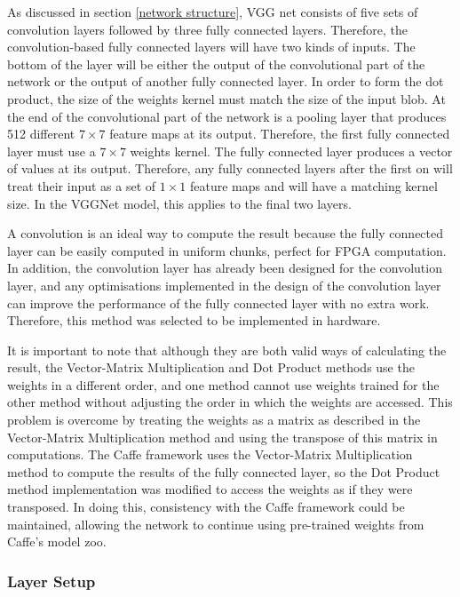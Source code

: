 \documentclass[12pt]{article}
\begin{document}
As discussed in section \ref{network structure}, VGG net consists of five sets of convolution layers followed by three fully connected layers. Therefore, the convolution-based fully connected layers will have two kinds of inputs. The bottom of the layer will be either the output of the convolutional part of the network or the output of another fully connected layer. In order to form the dot product, the size of the weights kernel must match the size of the input blob. At the end of the convolutional part of the network is a pooling layer that produces 512 different $7 \times 7$ feature maps at its output. Therefore, the first fully connected layer must use a $7 \times 7$ weights kernel. The fully connected layer produces a vector of values at its output. Therefore, any fully connected layers after the first on will treat their input as a set of $1 \times 1$ feature maps and will have a matching kernel size. In the VGGNet model, this applies to the final two layers.

A convolution is an ideal way to compute the result because the fully connected layer can be easily computed in uniform chunks, perfect for FPGA computation. In addition, the convolution layer has already been designed for the convolution layer, and any optimisations implemented in the design of the convolution layer can improve the performance of the fully connected layer with no extra work. Therefore, this method was selected to be implemented in hardware.

It is important to note that although they are both valid ways of calculating the result, the Vector-Matrix Multiplication and Dot Product methods use the weights in a different order, and one method cannot use weights trained for the other method without adjusting the order in which the weights are accessed. This problem is overcome by treating the weights as a matrix as described in the Vector-Matrix Multiplication method and using the transpose of this matrix in computations. The Caffe framework uses the Vector-Matrix Multiplication method to compute the results of the fully connected layer, so the Dot Product method implementation was modified to access the weights as if they were transposed. In doing this, consistency with the Caffe framework could be maintained, allowing the network to continue using pre-trained weights from Caffe's model zoo.

\subsubsection{Layer Setup}
\label{sec:Design-FC-Setup}
\end{document}
